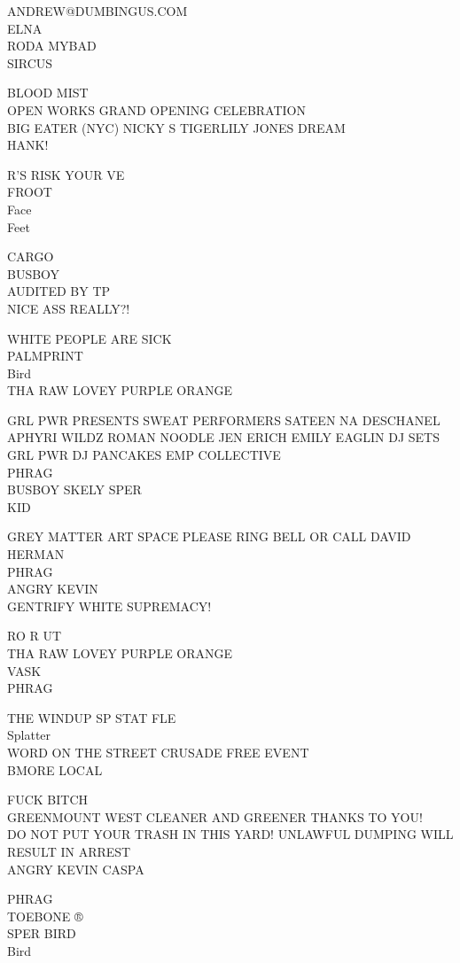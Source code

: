 \documentclass[10pt,letterpaper]{article}
\begin{document}
ANDREW@DUMBINGUS.COM\\
ELNA\\
RODA MYBAD\\
SIRCUS

BLOOD MIST\\
OPEN WORKS GRAND OPENING CELEBRATION\\
BIG EATER (NYC) NICKY S TIGERLILY JONES DREAM\\
HANK!

R'S RISK YOUR VE\\
FROOT\\
Face\\
Feet

CARGO\\
BUSBOY\\
AUDITED BY TP\\
NICE ASS REALLY?!

WHITE PEOPLE ARE SICK\\
PALMPRINT\\
Bird\\
THA RAW LOVEY PURPLE ORANGE

GRL PWR PRESENTS SWEAT PERFORMERS SATEEN  NA DESCHANEL APHYRI WILDZ ROMAN NOODLE JEN ERICH EMILY EAGLIN DJ SETS GRL PWR DJ PANCAKES EMP COLLECTIVE\\
PHRAG\\
BUSBOY SKELY SPER\\
KID

GREY MATTER ART SPACE PLEASE RING BELL OR CALL DAVID HERMAN\\
PHRAG\\
ANGRY KEVIN\\
GENTRIFY WHITE SUPREMACY!

RO R UT\\
THA RAW LOVEY PURPLE ORANGE\\
VASK\\
PHRAG

THE WINDUP SP STAT FLE\\
Splatter\\
WORD ON THE STREET CRUSADE FREE EVENT\\
BMORE LOCAL

FUCK BITCH\\
GREENMOUNT WEST CLEANER AND GREENER THANKS TO YOU!\\
DO NOT PUT YOUR TRASH IN THIS YARD!  UNLAWFUL DUMPING WILL RESULT IN ARREST\\
ANGRY KEVIN CASPA

PHRAG\\
TOEBONE ®\\
SPER BIRD\\
Bird
\end{document}
